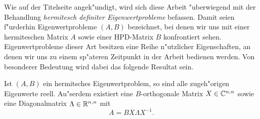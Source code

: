 Wie auf der Titelseite angek"undigt, wird sich diese Arbeit "uberwiegend mit der Behandlung \emph{hermitesch definiter Eigenwertprobleme} befassen.
Damit seien f"urderhin Eigenwertprobleme $(A,B)$ bezeichnet, bei denen wir uns mit einer hermiteschen Matrix $A$ sowie einer HPD-Matrix $B$ konfrontiert sehen.\\

Eigenwertprobleme dieser Art besitzen eine Reihe n"utzlicher Eigenschaften, an denen wir uns zu einem sp"ateren Zeitpunkt in der Arbeit bedienen werden.
Von besonderer Bedeutung wird dabei das folgende Resultat sein.

\begin{thm}\label{thm:chap1:realEigenvalues}
Ist $(A,B)$ ein hermitsches Eigenwertproblem, so sind alle zugeh"origen Eigenwerte reell.
Au"serdem existiert eine $B$-orthogonale Matrix $X\in\mathbb{C}^{n,n}$ sowie eine Diagonalmatrix $\Lambda\in\mathbb{R}^{n,n}$ mit
\begin{equation}\label{eq:chap1:evpMatrix}
A = BX\Lambda X^{-1}.
\end{equation}
\end{thm}

